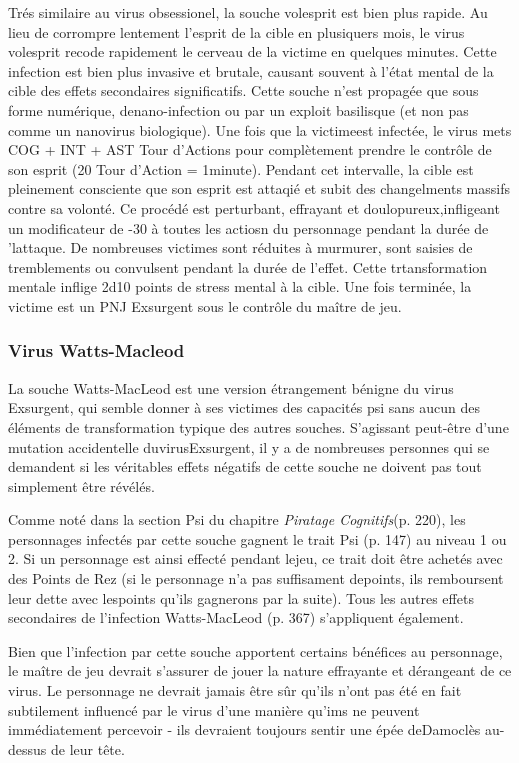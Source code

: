 Trés similaire au virus obsessionel, la souche volesprit est bien plus rapide. Au lieu de corrompre lentement l'esprit de la cible en plusiquers mois, le virus volesprit recode rapidement le cerveau de la victime en quelques minutes. Cette infection est  bien plus invasive et brutale, causant souvent à l'état mental de la cible des effets secondaires significatifs. Cette souche n'est propagée que sous forme numérique, denano-infection ou par un exploit basilisque (et non pas comme un nanovirus biologique). Une fois que la victimeest infectée, le virus mets COG + INT + AST Tour d'Actions pour complètement prendre le contrôle de son esprit (20 Tour d'Action =  1minute). Pendant cet intervalle, la cible est pleinement consciente que son esprit est attaqié et subit des changelments massifs contre sa volonté. Ce procédé est perturbant, effrayant et doulopureux,infligeant un modificateur de -30 à toutes les actiosn du personnage pendant la durée de 'lattaque. De nombreuses victimes sont réduites à murmurer, sont saisies de tremblements ou convulsent pendant la durée de l'effet. Cette trtansformation mentale inflige 2d10 points de stress mental à la cible. Une fois terminée, la victime est un PNJ Exsurgent sous le contrôle du maître de jeu. 



\subsubsection{Virus Watts-Macleod} 

La souche Watts-MacLeod est une version étrangement bénigne du virus Exsurgent, qui semble donner à ses victimes des capacités psi sans aucun des éléments de transformation typique des autres souches. S'agissant peut-être d'une mutation accidentelle duvirusExsurgent, il y a de nombreuses personnes qui se demandent si les véritables effets négatifs de cette souche ne doivent pas tout simplement être révélés. 

Comme noté dans la section Psi du chapitre \textit{Piratage Cognitifs}(p. 220), les personnages infectés par cette souche gagnent le trait Psi (p. 147) au niveau 1 ou 2. Si un personnage est ainsi effecté pendant lejeu, ce trait doit être achetés avec des Points de Rez (si le personnage n'a pas suffisament depoints, ils remboursent leur dette avec lespoints qu'ils gagnerons par la suite). Tous les autres effets secondaires de l'infection Watts-MacLeod (p. 367) s'appliquent également. 

Bien que l'infection par cette souche apportent certains bénéfices au personnage, le maître de jeu devrait s'assurer de jouer la nature effrayante et dérangeant de ce virus. Le personnage ne devrait jamais être sûr qu'ils n'ont pas été en fait subtilement influencé par le virus d'une manière qu'ims ne peuvent immédiatement percevoir - ils devraient toujours sentir une épée deDamoclès au-dessus de leur tête. 

